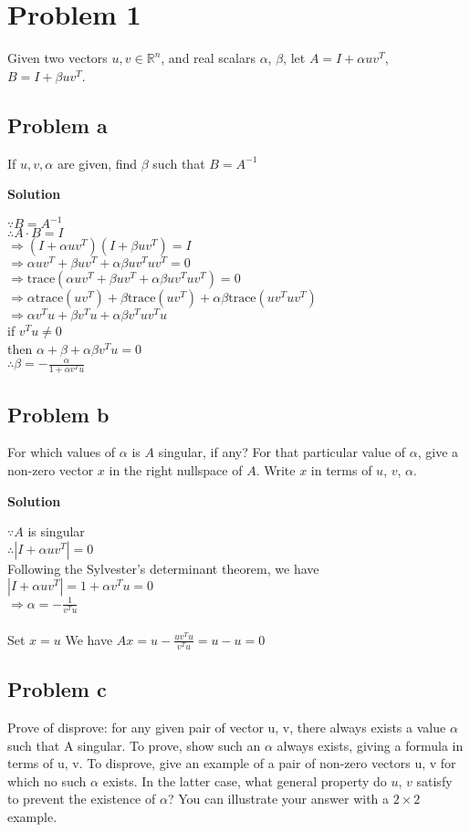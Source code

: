 \documentclass[12pt,oneside,a4paper]{article}
\title{\hmwkTitle}
\author{\hmwkAuthorName}
\date{\today}
\newcommand{\problem}[1]
{
    \clearpage
    \section*{Problem {#1}}
}
\newcommand{\subproblem}[1]
{
    \subsection*{Problem {#1}}
}
\newcommand{\solution}
{
    \vspace{15pt}
    \noindent\ignorespaces\textbf{\large Solution}
}
\newcommand{\trace}{\mathrm{trace}}
\begin{document}
\maketitle

\problem{1}
Given two vectors $u,v\in \mathbb{R}^{n}$, and real scalars $\alpha$, $\beta$, let $A = I + \alpha uv^{T}$, $B = I + \beta u v^T$.

\subproblem{a}
If $u, v, \alpha$ are given, find $\beta$ such that $B = A^{-1}$

\solution

$\because B = A^{-1}$\\
$\therefore A\cdot B = I$\\
$\Rightarrow (I + \alpha uv^{T})(I + \beta uv^{T}) = I$\\
$\Rightarrow \alpha uv^{T} + \beta uv^{T} + \alpha\beta uv^{T}uv^{T} = 0$\\
$\Rightarrow \mathrm{trace}(\alpha uv^{T} + \beta uv^{T} + \alpha\beta uv^{T}uv^{T}) = 0$\\
$\Rightarrow \alpha\trace (uv^{T}) + \beta\trace (uv^{T}) + \alpha\beta\trace (uv^{T}uv^{T})$\\
$\Rightarrow \alpha v^{T}u + \beta v^{T}u + \alpha\beta v^{T}uv^{T}u$\\
if $v^{T}u \neq 0$\\
then $\alpha + \beta + \alpha \beta v^{T}u = 0$\\
$\therefore \beta = -\frac{\alpha}{1 + \alpha v^{T}u}$ 
 
\subproblem{b}
For which values of $\alpha$ is $A$ singular, if any? For that particular value of $\alpha$, give a
non-zero vector $x$ in the right nullspace of $A$. Write $x$ in terms of $u$, $v$, $\alpha$.

\solution

$\because A$ is singular\\
$\therefore |I + \alpha uv^{T}| = 0$\\
Following the Sylvester's determinant theorem, we have\\
$|I + \alpha uv^{T}| = 1 + \alpha v^{T}u = 0$\\
$\Rightarrow \alpha = -\frac{1}{v^{T}u}$\\
\\
Set $x = u$
We have $Ax = u - \frac{uv^{T}u}{v^{T}u} = u - u = 0$

\subproblem{c}
Prove of disprove: for any given pair of vector u, v, there always exists a value $\alpha$ such that A singular. To prove, show such an $\alpha$ always exists, giving a formula in terms of u, v. To disprove, give an example of a pair of non-zero vectors u, v for which no such $\alpha$ exists. In the latter case, what general property do $u$, $v$ satisfy to prevent the existence of $\alpha$? You can illustrate your answer with a $2 \times 2$ example.
\end{document}
